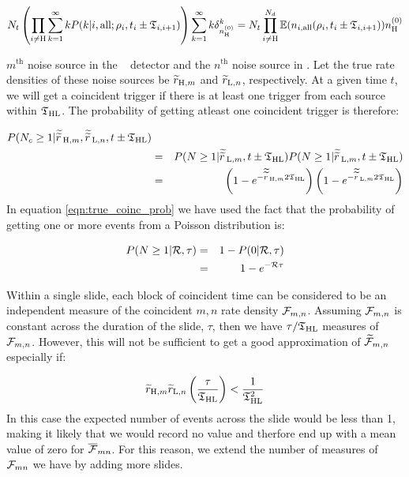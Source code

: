 \begin{equation}
\label{eqn:actual_slides}
N_t \left(\prod_{i \neq \mathrm{H}} \sum_{k=1}^{\infty} k P(k|i,\mathrm{all}; \rho_i, t_i \pm \mathfrak{T}_{i,i+1})\right) \sum_{k=1}^{\infty} k \delta^{k}_{n^{(0)}_{\mathrm{H}}} = N_t \prod_{i \neq \mathrm{H}}^{N_d} \mathbb{E}( n_{i,\mathrm{all}}(\rho_i, t_i \pm \mathfrak{T}_{i,i+1}) ) n^{(0)}_{\mathrm{H}}
\end{equation}



$m^{\mathrm{th}}$ noise source in the \varH~ detector and the $n^{\mathrm{th}}$ noise source in \varL. Let the true rate densities of these noise sources be $\widetilde{r}_{\mathrm{H},m}$ and $\widetilde{r}_{\mathrm{L},n}$, respectively. At a given time $t$, we will get a coincident trigger if there is at least one trigger from each source within $\mathfrak{T}_{\mathrm{H}\mathrm{L}}$. The probability of getting atleast one coincident trigger is therefore:

\begin{eqnarray}
P(N_c \geq 1 | \widetilde{\widetilde{r}\,}_{\mathrm{H},m}, \widetilde{\widetilde{r}\,}_{\mathrm{L},n}, t \pm \mathfrak{T}_{\mathrm{H}\mathrm{L}} ) &  & \nonumber \\
 & = & P(N \geq 1 | \widetilde{\widetilde{r}\,}_{\mathrm{L},m},t \pm \mathfrak{T}_{\mathrm{H}\mathrm{L}})P(N \geq 1 | \widetilde{\widetilde{r}\,}_{\mathrm{L},m}, t \pm \mathfrak{T}_{\mathrm{H}\mathrm{L}}) \nonumber \\
 & = & \left( 1 - e^{-\widetilde{\widetilde{r}\,}_{\mathrm{H},m}2\mathfrak{T}_{\mathrm{H}\mathrm{L}}} \right)\left( 1 - e^{-\widetilde{\widetilde{r}\,}_{\mathrm{L},m}2\mathfrak{T}_{\mathrm{H}\mathrm{L}}} \right)
\label{eqn:true_coinc_prob}
\end{eqnarray}
In equation \ref{eqn:true_coinc_prob} we have used the fact that the probability of getting one or more events from a Poisson distribution is:

\begin{eqnarray}
P(N \geq 1 | \mathcal{R}, \tau) & = & 1 - P(0|\mathcal{R},\tau) \nonumber \\
    & = & 1 - e^{-\mathcal{R}\tau}
\end{eqnarray}

Within a single slide, each block of coincident time can be considered to be an independent measure of the coincident $m,n$ rate density $\mathcal{F}_{m,n}$. Assuming $\mathcal{F}_{m,n}$ is constant across the duration of the slide, $\tau$, then we have $\tau/\mathfrak{T}_{\mathrm{H}\mathrm{L}}$ measures of $\mathcal{F}_{m,n}$. However, this will not be sufficient to get a good approximation of $\widetilde{\mathcal{F}}_{m,n}$ especially if:

\begin{equation}
\widetilde{r}_{\mathrm{H},m}\widetilde{r}_{\mathrm{L},n} \left(\frac{\tau}{\mathfrak{T}_{\mathrm{H}\mathrm{L}}}\right) < \frac{1}{\mathfrak{T}_{\mathrm{H}\mathrm{L}}^2}
\end{equation}
In this case the expected number of events across the slide would be less than 1, making it likely that we would record no value and therfore end up with a mean value of zero for $\overline{\mathcal{F}}_{mn}$. For this reason, we extend the number of measures of $\mathcal{F}_{mn}$ we have by adding more slides.

